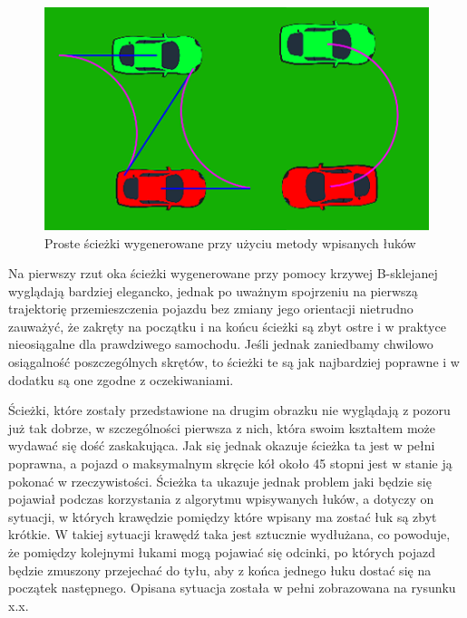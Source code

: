 \documentclass[a4paper,11pt,twoside]{report}
\theoremstyle{definition}
\begin{document}
\begin{figure}[h!]
\centering
\includegraphics[scale=0.9]{simplePath2}
\caption[Proste ścieżki wygenerowane przy użyciu metody wpisanych łuków]{Proste ścieżki wygenerowane przy użyciu metody wpisanych łuków}
\end{figure}

Na pierwszy rzut oka ścieżki wygenerowane przy pomocy krzywej B-sklejanej wyglądają bardziej elegancko, jednak po uważnym spojrzeniu na pierwszą trajektorię przemieszczenia pojazdu bez zmiany jego orientacji nietrudno zauważyć, że zakręty na początku i na końcu ścieżki są zbyt ostre i w praktyce nieosiągalne dla prawdziwego samochodu. Jeśli jednak zaniedbamy chwilowo osiągalność poszczególnych skrętów, to ścieżki te są jak najbardziej poprawne i w dodatku są one zgodne z oczekiwaniami.

Ścieżki, które zostały przedstawione na drugim obrazku nie wyglądają z pozoru już tak dobrze, w szczególności pierwsza z nich, która swoim kształtem może wydawać się dość zaskakująca. Jak się jednak okazuje ścieżka ta jest w pełni poprawna, a pojazd o maksymalnym skręcie kół około 45 stopni jest w stanie ją pokonać w rzeczywistości. Ścieżka ta ukazuje jednak problem jaki będzie się pojawiał podczas korzystania z algorytmu wpisywanych łuków, a dotyczy on sytuacji, w których krawędzie pomiędzy które wpisany ma zostać łuk są zbyt krótkie. W takiej sytuacji krawędź taka jest sztucznie wydłużana, co powoduje, że pomiędzy kolejnymi łukami mogą pojawiać się odcinki, po których pojazd będzie zmuszony przejechać do tyłu, aby z końca jednego łuku dostać się na początek następnego. Opisana sytuacja została w pełni zobrazowana na rysunku x.x.
\end{document}

